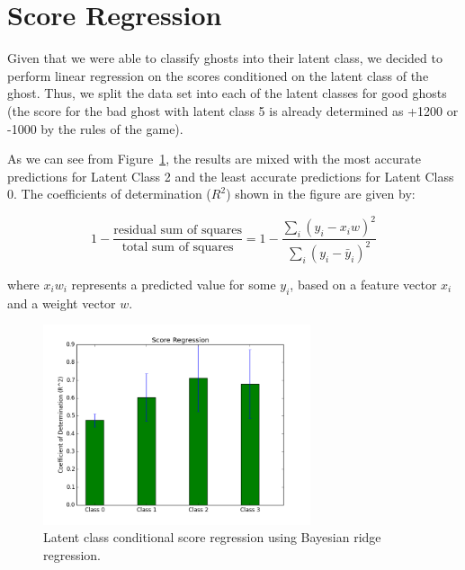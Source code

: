 \documentclass[11pt]{amsart}
\begin{document}
\section{Score Regression}

Given that we were able to classify ghosts into their latent class, we decided to perform linear regression on the scores conditioned on the latent class of the ghost. Thus, we split the data set into each of the latent classes for good ghosts (the score for the bad ghost with latent class 5 is already determined as +1200 or -1000 by the rules of the game). 

As we can see from Figure~\ref{fig:score}, the results are mixed with the most accurate predictions for Latent Class 2 and the least accurate predictions for Latent Class 0. The coefficients of determination ($R^2$) shown in the figure are given by:

$$ 1 - \frac{\text{residual sum of squares}}{\text{total sum of squares}} = 1 - \frac{\sum_i (y_i - x_i w)^2}{\sum_i (y_i - \bar{y}_i)^2}$$ 

where $x_i w_i$ represents a predicted value for some $y_i$, based on a feature vector $x_i$ and a weight vector $w$.

\begin{figure}[b]
	\centering
	\includegraphics[width=0.7\textwidth]{score_regression.png}
	\caption{Latent class conditional score regression using Bayesian ridge regression.}
	\label{fig:score}
\end{figure}
\end{document}
